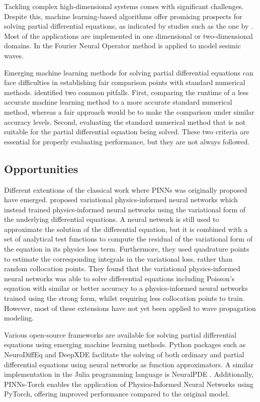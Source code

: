 \documentclass[11pt,twoside]{article}
\begin{document}
Tackling complex high-dimensional systems comes with significant challenges. Despite this, machine learning-based algorithms offer promising 
prospects for solving partial differential equations, as indicated by studies such as the one by . 
Most of the applications are implemented in one dimensional or two-dimensional domains. In  the Fourier 
Neural Operator method is applied to model sesimic waves.

Emerging machine learning methods for solving partial differential equations can face difficulties in establishing fair comparison points 
with standard numerical methods. \citeauthor{mcgreivy_weak_2024} identified two common pitfalls. First, comparing the runtime of a less 
accurate machine learning method to a more accurate standard numerical method, whereas a fair approach would be to make the comparison under 
similar accuracy levels. Second, evaluating the standard numerical method that is not suitable for the partial differential equation being 
solved. These two criteria are essential for properly evaluating performance, but they are not always followed. 

\subsection{Opportunities}

Different extentions of the classical work where PINNs was originally proposed have emerged.  
proposed variational physics-informed neural networks which instead trained physics-informed neural networks using the variational form of the 
underlying differential equations. A neural network is still used to approximate the solution of the differential equation, but it is combined 
with a set of analytical test functions to compute the residual of the variational form of the equation in its physics loss term. Furthermore, 
they used quadrature points to estimate the corresponding integrals in the variational loss, rather than random collocation points. They found 
that the variational physics-informed neural networks was able to solve differential equations including Poisson’s equation with similar or 
better accuracy to a physics-informed neural networks trained using the strong form, whilst requiring less collocation points to train. 
However, most of these extensions have not yet been applied to wave propagation modeling.

Various open-source frameworks are available for solving partial differential equations using emerging machine learning methods. Python 
packages such as NeuroDiffEq \citep{chen2020neurodiffeq} and DeepXDE \citep{lu2021deepxde} facilitate the solving of both ordinary and 
partial differential equations using neural networks as function approximators. A similar implementation in the Julia programming language 
is NeuralPDE \citep{https://doi.org/10.48550/arxiv.2107.09443}. Additionally, PINNs-Torch \citep{bafghi_pinns-torch_2023} enables the 
application of Physics-Informed Neural Networks using PyTorch, offering improved performance compared to the original model.
\end{document}

